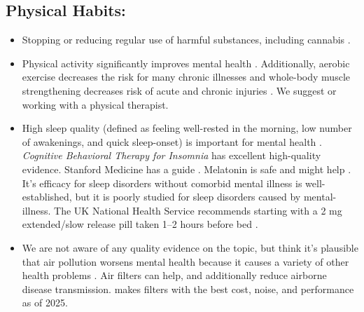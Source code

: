 \documentclass[12pt,letterpaper]{book}
\begin{document}
\subsection*{Physical Habits:}
\begin{itemize}
   \item Stopping or reducing regular use of harmful substances, including cannabis \cite{nuttDrugHarms}.
   \item Physical activity significantly improves mental health \cite{activityMetaAnalysis}. Additionally, aerobic exercise decreases the risk for many chronic illnesses \cite{liebermanExercised} and whole-body muscle strengthening decreases risk of acute and chronic injuries \cite{lauersenStrength}. We suggest \textcite{lowBodyweight} or working with a physical therapist.
   \item High sleep quality (defined as feeling well-rested in the morning, low number of awakenings, and quick sleep-onset) is important for  mental health \cite{scottSleep}. \textit{Cognitive Behavioral Therapy for Insomnia} has excellent high-quality evidence. Stanford Medicine has a guide \cite{stanfordSleep}. Melatonin is safe and might help \cite{moon2022role}. It's efficacy for sleep disorders without comorbid mental illness is well-established, but it is poorly studied for sleep disorders caused by mental-illness. The UK National Health Service recommends starting with a 2 mg extended/slow release pill taken 1–2 hours before bed \cite{nhsMelatonin}.
   \item We are not aware of any quality evidence on the topic, but think it's plausible that air pollution worsens mental health because it causes a variety of other health problems \cite{airPollution}. Air filters can help, and additionally reduce airborne disease transmission. \textcite{cleanAir} makes filters with the best cost, noise, and performance as of 2025.
\end{itemize}
\end{document}
